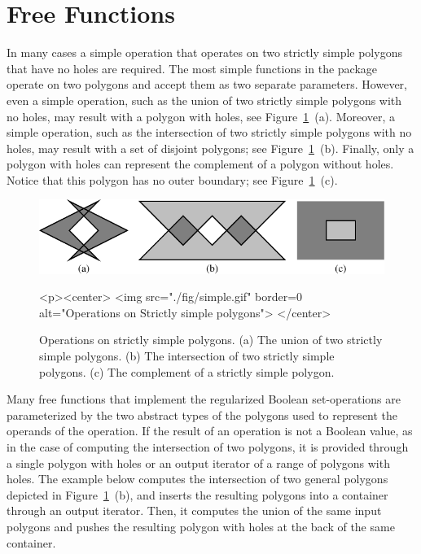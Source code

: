 \section{Free Functions}
\label{bso_sec:free_functions}
In many cases a simple operation that operates on two strictly simple
polygons that have no holes are required. The most simple functions in
the package operate on two polygons and accept them as two separate
parameters. However, even a simple operation, such as the union of two
strictly simple polygons with no holes, may result with a polygon with
holes, see Figure~\ref{fig:simple}~(a). Moreover, a simple operation,
such as the intersection of two strictly simple polygons with no holes, 
may result with a set of disjoint polygons; see
Figure~\ref{fig:simple}~(b). Finally, only a polygon with holes can
represent the complement of a polygon without holes. Notice that this
polygon has no outer boundary; see Figure~\ref{fig:simple}~(c).

\begin{figure}[!htp]
\begin{ccTexOnly}
  \includegraphics{Boolean_set_operations_2/fig/simple}
\end{ccTexOnly}
\begin{ccHtmlOnly}
  <p><center>
    <img src="./fig/simple.gif" border=0 alt="Operations on Strictly
    simple polygons">
  </center>
\end{ccHtmlOnly}
\caption{\label{fig:simple}Operations on strictly simple polygons. (a) The union of two
strictly simple polygons. (b) The intersection of two strictly simple
polygons. (c) The complement of a strictly simple polygon.} 
\end{figure}

Many free functions that implement the regularized Boolean 
set-operations are parameterized by the two abstract types of the polygons 
used to represent the operands of the operation. If the result of an 
operation is not a Boolean value, as in the case of computing the 
intersection of two polygons, it is provided through a single polygon with 
holes or an output iterator of a range of polygons with holes. The example
below computes the intersection of two general polygons depicted in 
Figure~\ref{fig:simple}~(b), and inserts the resulting polygons into a 
container through an output iterator. Then, it computes the union of the
same input polygons and pushes the resulting polygon with holes at the
back of the same container. 


